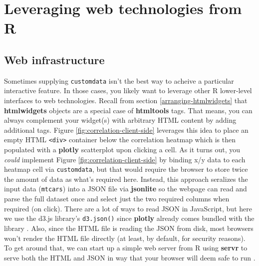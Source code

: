 \documentclass[
  12pt,
]{krantz}
\begin{document}
\hypertarget{client-side}{%
\chapter{Leveraging web technologies from R}\label{client-side}}

\hypertarget{web-infrastructure}{%
\section{Web infrastructure}\label{web-infrastructure}}

Sometimes supplying \texttt{customdata} isn't the best way to acheive a particular interactive feature. In those cases, you likely want to leverage other R lower-level interfaces to web technologies. Recall from section \ref{arranging-htmlwidgets} that \textbf{htmlwidgets} objects are a special case of \textbf{htmltools} tags. That means, you can always complement your widget(s) with arbitrary HTML content by adding additional tags. Figure \ref{fig:correlation-client-side} leverages this idea to place an empty HTML \texttt{\textless{}div\textgreater{}} container below the correlation heatmap which is then populated with a \textbf{plotly} scatterplot upon clicking a cell. As it turns out, you \emph{could} implement Figure \ref{fig:correlation-client-side} by binding x/y data to each heatmap cell via \texttt{customdata}, but that would require the browser to store twice the amount of data as what's required here. Instead, this approach seralizes the input data (\texttt{mtcars}) into a JSON file via \textbf{jsonlite} so the webpage can read and parse the full dataset once and select just the two required columns when required (on click). There are a lot of ways to read JSON in JavaScript, but here we use the d3.js library's \texttt{d3.json()} since \textbf{plotly} already comes bundled with the library \citep{d3js}. Also, since the HTML file is reading the JSON from disk, most browsers won't render the HTML file directly (at least, by default, for security reasons). To get around that, we can start up a simple web server from R using \textbf{servr} to serve both the HTML and JSON in way that your browser will deem safe to run \citep{servr}.
\end{document}
